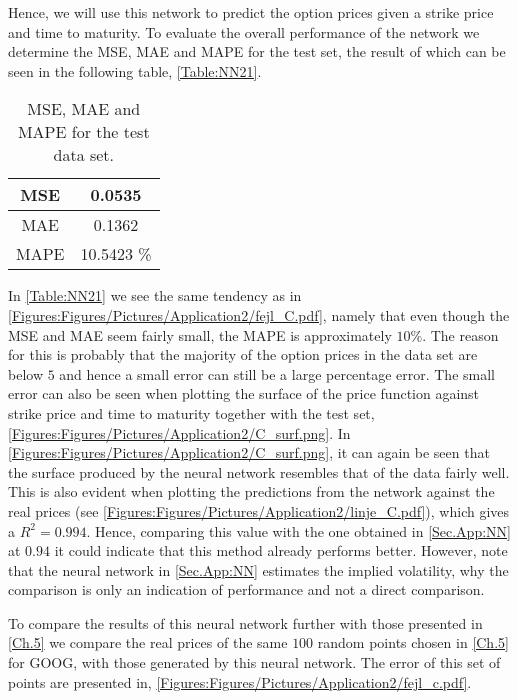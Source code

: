 
Hence, we will use this network to predict the option prices given a strike price and time to maturity. To evaluate the overall performance of the network we determine the MSE, MAE and MAPE for the test set, the result of which can be seen in the following table, \autoref{Table:NN21}. 

\begin{table}[H]
    \centering
    {\renewcommand{\arraystretch}{1.25}\begin{tabular}{c|c}
        MSE  &  0.0535\\ \hline
        MAE  &  0.1362\\ \hline
        MAPE &  10.5423 \%\\ 
    \end{tabular}}
    \caption{MSE, MAE and MAPE for the test data set.}
    \label{Table:NN21}
\end{table}

In \autoref{Table:NN21} we see the same tendency as in \autoref{Figures:Figures/Pictures/Application2/fejl_C.pdf}, namely that even though the MSE and MAE seem fairly small, the MAPE is approximately $10\%$. The reason for this is probably that the majority of the option prices in the data set are below $5$ and hence a small error can still be a large percentage error. The small error can also be seen when plotting the surface of the price function against strike price and time to maturity together with the test set, \autoref{Figures:Figures/Pictures/Application2/C_surf.png}. In \autoref{Figures:Figures/Pictures/Application2/C_surf.png}, it can again be seen that the surface produced by the neural network resembles that of the data fairly well. This is also evident when plotting the predictions from the network against the real prices (see \autoref{Figures:Figures/Pictures/Application2/linje_C.pdf}), which gives a $R^2 = 0.994$. Hence, comparing this value with the one obtained in \autoref{Sec.App:NN} at $0.94$ it could indicate that this method already performs better. However, note that the neural network in \autoref{Sec.App:NN} estimates the implied volatility, why the comparison is only an indication of performance and not a direct comparison.


To compare the results of this neural network further with those presented in \autoref{Ch.5} we compare the real prices of the same $100$ random points chosen in \autoref{Ch.5} for GOOG, with those generated by this neural network. The error of this set of points are presented in, \autoref{Figures:Figures/Pictures/Application2/fejl_c.pdf}.


